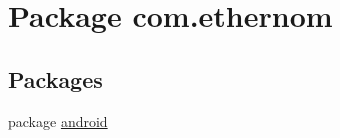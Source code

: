 \hypertarget{namespacecom_1_1ethernom}{}\section{Package com.\+ethernom}
\label{namespacecom_1_1ethernom}
\subsection*{Packages}
\begin{DoxyCompactItemize}
\item 
package \mbox{\hyperlink{namespacecom_1_1ethernom_1_1android}{android}}
\end{DoxyCompactItemize}
